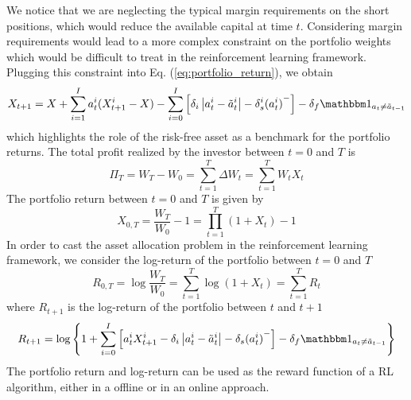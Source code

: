 We notice that we are neglecting the typical margin requirements on the short
positions, which would reduce the available capital at time $t$. Considering
margin requirements would lead to a more complex constraint on the portfolio
weights which would be difficult to treat in the reinforcement learning
framework. Plugging this constraint into Eq. (\ref{eq:portfolio_return}), we
obtain
\begin{equation}\label{eq:portfolio_return_benchmark}
	X_{t+1} = X + \sum^{I}_{i=1} a_t^i (X_{t+1}^i - X) - \sum^{I}_{i=0}
	\left[\delta_i \left| a_t^i - \tilde{a}_t^i \right| - \delta_s^i
	{(a_t^i)}^-\right] - \delta_f \ind{{a}_t \neq \tilde{{a}}_{t-1}}   
\end{equation}
which highlights the role of the risk-free asset as a benchmark for the 
portfolio returns. The total profit realized by the investor between $t=0$ and
$T$ is 
\begin{equation*}
	\Pi_T = W_T - W_0 = \sum^{T}_{t=1} \Delta W_t = \sum^{T}_{t=1} W_t X_t  
\end{equation*}
The portfolio return between $t=0$ and $T$ is given by
\begin{equation*}
	X_{0,T} = \frac{W_T}{W_0} - 1 = \prod_{t=1}^T (1+X_t) - 1
\end{equation*}
In order to cast the asset allocation problem in the reinforcement learning
framework, we consider the log-return of the portfolio between $t=0$ and $T$
\begin{equation}
	R_{0,T} = \log \frac{W_T}{W_0} = \sum^{T}_{t=1} \log(1+X_t) = \sum_{t=1}^T
	R_t
\end{equation}
where $R_{t+1}$ is the log-return of the portfolio between $t$ and $t+1$
\begin{equation}
	R_{t+1} = \log \left\{ 1 + \sum^{I}_{i=0} \left[ a_t^i X_{t+1}^i - \delta_i
	\left| a_t^i - \tilde{a}_t^i \right| - \delta_s {(a_t^i)}^- \right] -
	\delta_f \ind{{a}_t \neq \tilde{{a}}_{t-1}}\right\}
\end{equation}
The portfolio return and log-return can be used as the reward function of a
RL algorithm, either in a offline or in an online approach.

